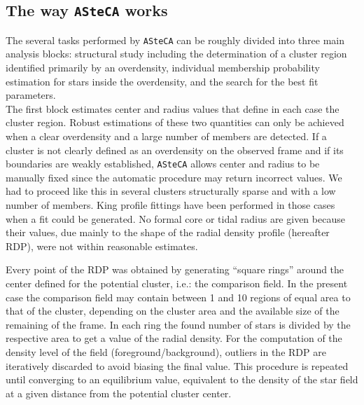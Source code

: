 \documentclass[draft]{aa}
\begin{document}
\subsection{The way \texttt{ASteCA} works}
\label{ssec:asteca_works}

The several tasks performed by \texttt{ASteCA} can be roughly divided into three
main analysis blocks: structural study including the determination of a cluster
region identified primarily by an overdensity, individual membership probability
estimation for stars inside the overdensity, and the search for the best fit
parameters.\\

The first block estimates center and radius values 
that define in each case the cluster region. Robust estimations
of these two quantities can only be achieved when a clear overdensity and a
large number of members are detected. If a cluster is not
clearly defined as an overdensity on the observed frame and if its boundaries are
weakly established, \texttt{ASteCA} allows center and radius to be manually
fixed since the automatic procedure may return incorrect values. We had to
proceed like this in several clusters structurally sparse and with a low number
of members.  King profile fittings have been performed in those cases when a
fit could be generated. No formal core or tidal radius are given because their
values, due mainly to the shape of the radial density profile (hereafter RDP),
were not within reasonable estimates.

Every point of the RDP was obtained by generating ``square rings'' around the
center defined for the potential cluster, i.e.: the comparison field.
In the present case the comparison field may contain between 1 and 10 regions
of equal area to that of the cluster, depending on the cluster area and the
available size of the remaining of the frame.
In each ring the found number of stars is divided by the respective area
to get a value of the radial density. For the computation of the density
level of the field (foreground/background), outliers in the RDP are iteratively
discarded to avoid biasing the final value. This procedure is repeated until
converging to an equilibrium value, equivalent to the density of the star field
at a given distance from the potential cluster center.\\
\end{document}
